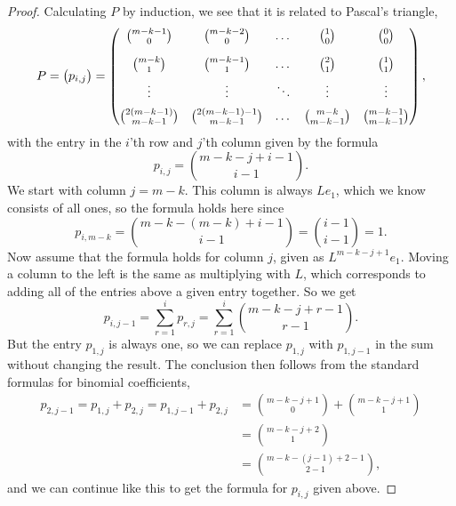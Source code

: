 \begin{proof}
  Calculating $P$ by induction, we see that it is related to
  Pascal's triangle,
  \[ P =
  \begin{pmatrix}
    p_{i,j}
  \end{pmatrix}
  =
  \begin{pmatrix}
    {m-k-1 \choose 0}\vspace{1em} & {m-k-2\choose 0} & \dots &
    {1\choose 0} & {0 \choose 0} \\
    {m-k \choose 1} \vspace{0.5em} & {m-k-1 \choose 1} & \dots & {2
      \choose 1} & {1 \choose 1} \\
    \vdots \vspace{0.5em} & \vdots & \ddots & \vdots & \vdots\\
    {2(m-k-1) \choose {m-k-1}} & {2(m-k-1)-1 \choose m-k-1} & \dots &
    {m-k \choose m-k-1} & {m-k-1 \choose m-k-1}
  \end{pmatrix}, \]
  with the entry in the $i$'th row and $j$'th column given by the
  formula
  \[ p_{i,j} = { m-k-j+i-1 \choose i-1}. \] 
  We start with column $j=m-k$. This column is always $Le_1$, which we
  know consists of all ones, so the formula holds here since
  \[ p_{i,m-k} = { m-k-(m-k)+i-1 \choose i-1} = {i-1\choose i-1} =
  1. \]
  Now assume that the formula holds for column
  $j$, given as $L^{m-k-j+1}e_1$. Moving a column to the left is the
  same as multiplying with $L$, which corresponds to
  adding all of the entries above a given entry together. So we get
  \[ p_{i,j-1} = \sum_{r=1}^{i} p_{r,j}  =  \sum_{r=1}^i { m-k-j+r-1
    \choose r-1}.  \]
  But the entry $p_{1,j}$ is always one, so we can replace
  $p_{1,j}$ with $p_{1,j-1}$ in the sum without changing the
  result. The conclusion then follows from the standard formulas for
  binomial coefficients,
  \begin{align*}
    p_{2,j-1} = p_{1,j} + p_{2,j} 
    = p_{1,j-1} + p_{2,j} &= {m-k-j+1\choose 0} + {m-k-j+1 \choose
                            1}\\
                          &= {m-k-j+2\choose 1}\\
                          &= {m-k-(j-1)+2-1\choose 2-1},
  \end{align*}
  and we can continue like this to get the formula for $p_{i,j}$
  given above.
  

\end{proof}
